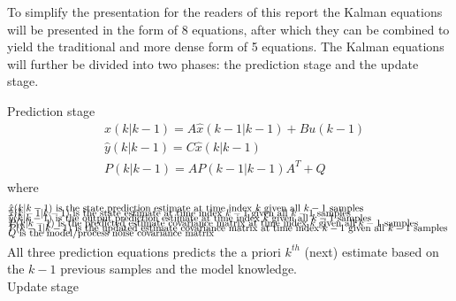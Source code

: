 To simplify the presentation for the readers of this report the Kalman equations will be presented in the form of 8 equations, after which they can be combined to yield the traditional and more dense form of 5 equations.
The Kalman equations will further be divided into two phases: the prediction stage and the update stage. 

{Prediction stage}
\begin{align}
	&\hat{{x}}	(k|k-1) = {A} 	\hat{{x}}(k-1|k-1) + {B}{u}(k-1)  				\label{eq:Kalman_pred_state} 	\\
	&\hat{{y}}	(k|k-1) = {C}	\hat{{x}}(k|k-1)										\label{eq:Kalman_pred_output} 	\\
	&{P}			(k|k-1) = {A}	{P}(k-1|k-1){A}^T+{Q} 								\label{eq:Kalman_pred_cov} 		
\end{align}
where 
\begin{align*}
	&\text{$\hat{{x}}	(k|k-1)$ 	is the state prediction 			estimate at time index $k$ 		given all $ k-1 $ samples		}	\\[-1em]
	&\text{$\hat{{x}}	(k-1|k-1)$ 	is the state 						estimate at time index $k-1$ 	given all $ k-1 $ samples		}	\\[-1em]
	&\text{$\hat{{y}}	(k|k-1)$ 	is the output prediction 			estimate at time index $k$ 		given all $ k-1 $ samples		}	\\[-1em]
	&\text{${P}			(k|k-1)$ 	is the predicted estimate  covariance matrix at time index $k$ 		given all $ k-1 $ samples		}	\\[-1em]
	&\text{${P}			(k-1|k-1)$ 	is the updated estimate    covariance matrix at time index $k-1$ 	given all $ k-1 $ samples		}	\\[-1em]
	&\text{${Q}$						is the model/process noise covariance matrix														}	\\[-1em]
\end{align*}

All three prediction equations predicts the a priori $k^{th}$ (next) estimate based on the $k-1$ previous samples and the model knowledge.\\

{Update stage}

